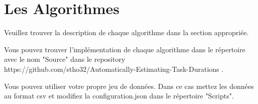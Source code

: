 \newpage{}

\section{Les Algorithmes}

Veuillez trouver la description de chaque algorithme
dans la section appropriée.

Vous pouvez trouver l'implémentation de chaque algorithme 
dans le répertoire avec le nom "Source" dans le repository 
https://github.com/stho32/Automatically-Estimating-Task-Durations .

Vous pouvez utiliser votre propre jeu de données.
Dans ce cas mettez les données au format csv 
et modifiez la configuration.json dans le répertoire
"Scripts".

